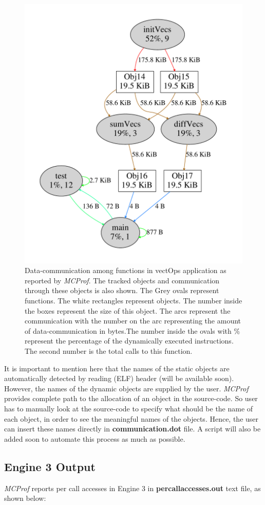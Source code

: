\documentclass[10pt]{article}
\newcommand{\MCPROF}{\emph{MCProf}}
\begin{document}
\begin{figure}[!h]
\centering
\includegraphics[width=0.55\linewidth]{figures/commWithObjects.pdf}
\caption{Data-communication among functions in vectOps application as reported
    by \MCPROF{}. The tracked objects and communication through these objects
    is also shown. The Grey ovals represent functions. The white rectangles
    represent objects. The number inside the boxes represent the size of this
    object. The arcs represent the communication with the number on
    the arc representing the amount of data-communication in bytes.The number
    inside the ovals with \% represent the percentage of the dynamically
    executed instructions. The second number is the total calls to this function.}
\label{fig:commWithObjects}
\end{figure}

It is important to mention here that the names of the static objects are 
automatically detected by reading (ELF) header (will be available soon). 
However, the names of the dynamic objects are supplied by the user. \MCPROF{} 
provides complete path to the allocation of an object in the source-code. So 
user has to manually look at the source-code to specify what should be the name 
of each object, in order to see the meaningful names of the objects. Hence, the 
user can insert these names directly in \textbf{communication.dot} file. A 
script will also be added soon to automate this process as much as possible.

\subsection{Engine 3 Output}

\MCPROF{} reports per call accesses in Engine 3 in \textbf{percallaccesses.out}
text file, as shown below:
\end{document}
